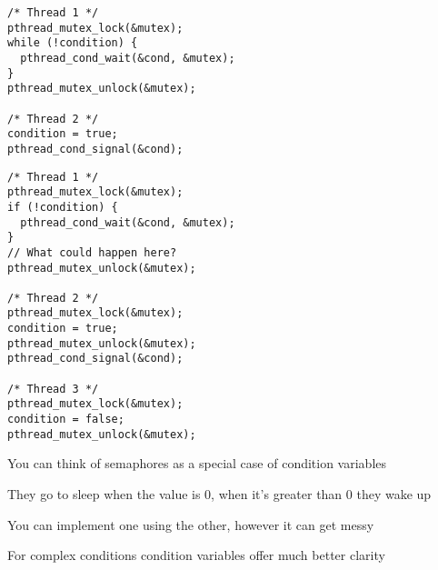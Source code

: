   \begin{slide}


    \begin{verbatim}
/* Thread 1 */
pthread_mutex_lock(&mutex);
while (!condition) {
  pthread_cond_wait(&cond, &mutex);
}
pthread_mutex_unlock(&mutex);

/* Thread 2 */
condition = true;
pthread_cond_signal(&cond);
    \end{verbatim}

  \end{slide}

  \begin{slide}


    \begin{verbatim}
/* Thread 1 */
pthread_mutex_lock(&mutex);
if (!condition) {
  pthread_cond_wait(&cond, &mutex);
}
// What could happen here?
pthread_mutex_unlock(&mutex);

/* Thread 2 */
pthread_mutex_lock(&mutex);
condition = true;
pthread_mutex_unlock(&mutex);
pthread_cond_signal(&cond);

/* Thread 3 */
pthread_mutex_lock(&mutex);
condition = false;
pthread_mutex_unlock(&mutex);
    \end{verbatim}

  \end{slide}

  \begin{slide}


    You can think of semaphores as a special case of condition variables

    \leftspace{}They go to sleep when the value is 0, when it's greater
    than 0 they wake up
    \medskip

    You can implement one using the other, however it can get messy
    \medskip

    For complex conditions condition variables offer much better clarity

  \end{slide}

